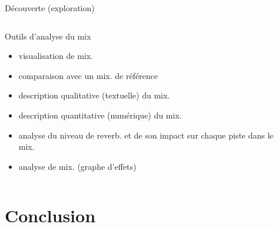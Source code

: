 \documentclass[9pt, aspectratio=169]{beamer}
\begin{document}
\begin{frame}{Découverte (exploration)} %

\begin{columns}
    \begin{column}{0.48\textwidth}
	    Outils d'analyse du mix
		\begin{itemize}
			\item visualisation de mix. \cite{ford_mixviz_2015}
			\item comparaison avec un mix. de référence
			\item description qualitative (textuelle) du mix.
			\item description quantitative (numérique) du mix.
			\item analyse du niveau de reverb. et de son impact sur chaque piste dans le mix. \cite{de_man_perceptual_2017}
			\item analyse de mix. (graphe d'effets) \cite{lee_blind_2023}
		\end{itemize}
    \end{column}
    \begin{column}{0.48\textwidth}
    \end{column}
\end{columns}

\end{frame}

\section{Conclusion}
\end{document}
